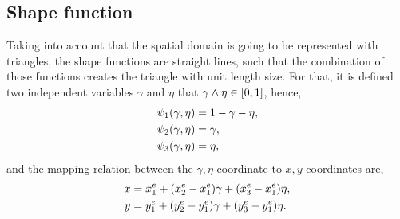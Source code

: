 \documentclass[main.tex]{subfiles}
\begin{document}
\subsection{Shape function}
Taking into account that the spatial domain is going to be represented with triangles, the shape functions are straight lines, such that the combination of those functions creates the triangle with unit length size.
For that, it is defined two independent variables $\gamma$ and $\eta$ that $\gamma\wedge\eta\in\qty[0,1]$, hence,
\begin{align}
    \psi_1\qty(\gamma,\eta) &= 1-\gamma-\eta, \\
    \psi_2\qty(\gamma,\eta) &= \gamma, \\
    \psi_3\qty(\gamma,\eta) &= \eta,
    \label{eqn9:shapeFunctions}
\end{align}
and the mapping relation between the $\gamma,\eta$ coordinate to $x,y$ coordinates are,
\begin{align*}
    x &= x_1^e + \qty(x_2^e-x_1^e)\gamma + \qty(x_3^e-x_1^e)\eta, \\
    y &= y_1^e + \qty(y_2^e-y_1^e)\gamma + \qty(y_3^e-y_1^e)\eta.
\end{align*}
\end{document}
